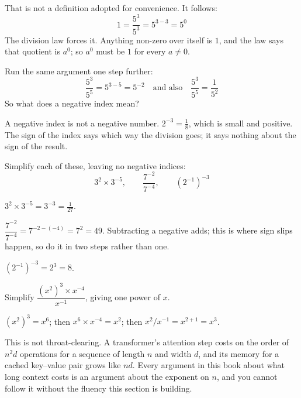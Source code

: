 \begin{fr}
That is not a definition adopted for convenience. It follows:
\[ 1 = \frac{5^{3}}{5^{3}} = 5^{3-3} = 5^{0} \]
The division law forces it. Anything non-zero over itself is $1$, and the law
says that quotient is $a^{0}$; so $a^{0}$ must be $1$ for every $a \ne 0$.

Run the same argument one step further:
\[ \frac{5^{3}}{5^{5}} = 5^{3-5} = 5^{-2} \quad\text{and also}\quad
   \frac{5^{3}}{5^{5}} = \frac{1}{5^{2}} \]
So what does a negative index mean?
\nextframe
\end{fr}

\begin{fr}
A negative index is not a negative number. $2^{-3} = \tfrac{1}{8}$, which is
small and positive. The sign of the index says which way the division goes; it
says nothing about the sign of the result.

Simplify each of these, leaving no negative indices:
\[ 3^{2} \times 3^{-5}, \qquad \frac{7^{-2}}{7^{-4}}, \qquad (2^{-1})^{-3} \]
\dotline
\nextframe
\end{fr}

\begin{fr}
\begin{ansblock}
$3^{2} \times 3^{-5} = 3^{-3} = \tfrac{1}{27}$.

$\dfrac{7^{-2}}{7^{-4}} = 7^{-2-(-4)} = 7^{2} = 49$. Subtracting a negative
adds; this is where sign slips happen, so do it in two steps rather than one.

$(2^{-1})^{-3} = 2^{3} = 8$.
\end{ansblock}

\yourturn
Simplify $\dfrac{(x^{2})^{3} \times x^{-4}}{x^{-1}}$, giving one power of $x$.
\dotline
\nextframe
\end{fr}

\begin{fr}
\begin{ansblock}
$(x^{2})^{3} = x^{6}$; then $x^{6} \times x^{-4} = x^{2}$; then
$x^{2}/x^{-1} = x^{2+1} = x^{3}$.
\end{ansblock}

\begin{aibox}
This is not throat-clearing. A transformer's attention step costs on the order
of $n^{2}d$ operations for a sequence of length $n$ and width $d$, and its
memory for a cached key--value pair grows like $n d$. Every argument in this
book about what long context costs is an argument about the exponent on $n$,
and you cannot follow it without the fluency this section is building.
\end{aibox}
\end{fr}

